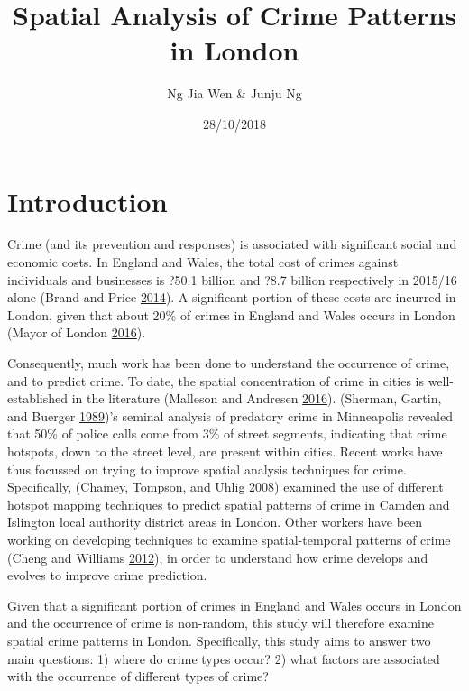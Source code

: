 \documentclass[]{article}
\title{Spatial Analysis of Crime Patterns in London}
\author{Ng Jia Wen \& Junju Ng}
\date{28/10/2018}
\theoremstyle{definition}
\theoremstyle{definition}
\theoremstyle{definition}
\theoremstyle{remark}
\begin{document}
\maketitle

{
\setcounter{tocdepth}{2}
\tableofcontents
}
\pagebreak

\pagebreak

\section{Introduction}\label{introduction}

Crime (and its prevention and responses) is associated with significant
social and economic costs. In England and Wales, the total cost of
crimes against individuals and businesses is ?50.1 billion and ?8.7
billion respectively in 2015/16 alone (Brand and Price
\protect\hyperlink{ref-Brand2014}{2014}). A significant portion of these
costs are incurred in London, given that about 20\% of crimes in England
and Wales occurs in London (Mayor of London
\protect\hyperlink{ref-MayorofLondon2016}{2016}).

Consequently, much work has been done to understand the occurrence of
crime, and to predict crime. To date, the spatial concentration of crime
in cities is well-established in the literature (Malleson and Andresen
\protect\hyperlink{ref-Malleson2016}{2016}). (Sherman, Gartin, and
Buerger \protect\hyperlink{ref-Sherman1989}{1989})'s seminal analysis of
predatory crime in Minneapolis revealed that 50\% of police calls come
from 3\% of street segments, indicating that crime hotspots, down to the
street level, are present within cities. Recent works have thus focussed
on trying to improve spatial analysis techniques for crime.
Specifically, (Chainey, Tompson, and Uhlig
\protect\hyperlink{ref-Chainey2008}{2008}) examined the use of different
hotspot mapping techniques to predict spatial patterns of crime in
Camden and Islington local authority district areas in London. Other
workers have been working on developing techniques to examine
spatial-temporal patterns of crime (Cheng and Williams
\protect\hyperlink{ref-Cheng2012}{2012}), in order to understand how
crime develops and evolves to improve crime prediction.

Given that a significant portion of crimes in England and Wales occurs
in London and the occurrence of crime is non-random, this study will
therefore examine spatial crime patterns in London. Specifically, this
study aims to answer two main questions: 1) where do crime types occur?
2) what factors are associated with the occurrence of different types of
crime?
\end{document}
